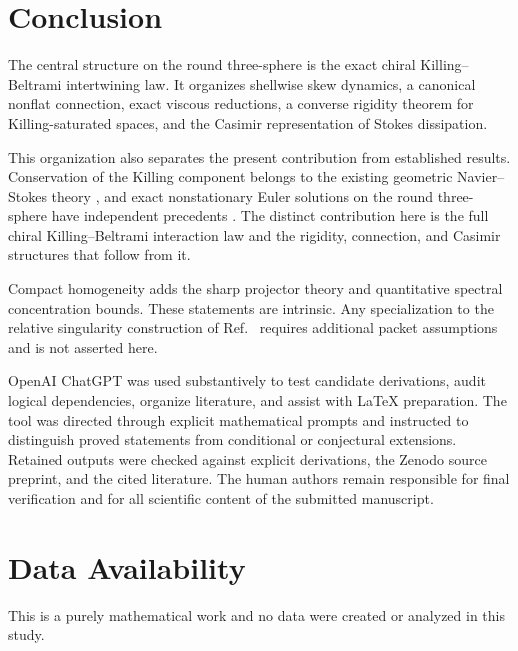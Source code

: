 \documentclass[
 aps,
 prd,
 reprint,
 amsmath,
 amssymb,
 nofootinbib,
 superscriptaddress
]{revtex4-2}
\theoremstyle{definition}
\theoremstyle{remark}
\begin{document}
\section{Conclusion}

The central structure on the round three-sphere is the exact chiral
Killing--Beltrami intertwining law. It organizes shellwise skew dynamics, a
canonical nonflat connection, exact viscous reductions, a converse rigidity
theorem for Killing-saturated spaces, and the Casimir representation of
Stokes dissipation.

This organization also separates the present contribution from established
results. Conservation of the Killing component belongs to the existing
geometric Navier--Stokes theory \cite{SamavakiTuomela2020}, and exact
nonstationary Euler solutions on the round three-sphere have independent
precedents \cite{HeslinPreston2026}. The distinct contribution here is the
full chiral Killing--Beltrami interaction law and the rigidity, connection,
and Casimir structures that follow from it.

Compact homogeneity adds the sharp projector theory and quantitative
spectral concentration bounds. These statements are intrinsic. Any
specialization to the relative singularity construction of
Ref.~\cite{PreeceBatenin2026} requires additional packet assumptions and is
not asserted here.

\begin{acknowledgments}
OpenAI ChatGPT was used substantively to test candidate
derivations, audit logical dependencies, organize literature, and assist with
\LaTeX{} preparation. The tool was directed through explicit mathematical
prompts and instructed to distinguish proved statements from conditional or
conjectural extensions. Retained outputs were checked against explicit
derivations, the Zenodo source preprint, and the cited literature. The human
authors remain responsible for final verification and for all scientific
content of the submitted manuscript.
\end{acknowledgments}


\section*{Data Availability}
This is a purely mathematical work and no data were created or analyzed in
this study.
\end{document}
